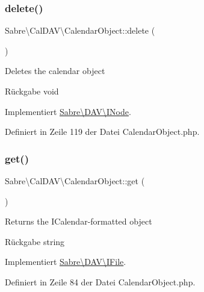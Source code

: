 \subsubsection{\texorpdfstring{delete()}{delete()}}
{\footnotesize\ttfamily Sabre\textbackslash{}\+Cal\+D\+A\+V\textbackslash{}\+Calendar\+Object\+::delete (\begin{DoxyParamCaption}{ }\end{DoxyParamCaption})}

Deletes the calendar object

\begin{DoxyReturn}{Rückgabe}
void 
\end{DoxyReturn}


Implementiert \mbox{\hyperlink{interface_sabre_1_1_d_a_v_1_1_i_node_a72cd0ee4e36dfced2b0412d14dbd73e6}{Sabre\textbackslash{}\+D\+A\+V\textbackslash{}\+I\+Node}}.



Definiert in Zeile 119 der Datei Calendar\+Object.\+php.

\mbox{\label{class_sabre_1_1_cal_d_a_v_1_1_calendar_object_adef5802dc47306abb1e00a18a63ca7eb}} 
\subsubsection{\texorpdfstring{get()}{get()}}
{\footnotesize\ttfamily Sabre\textbackslash{}\+Cal\+D\+A\+V\textbackslash{}\+Calendar\+Object\+::get (\begin{DoxyParamCaption}{ }\end{DoxyParamCaption})}

Returns the I\+Calendar-\/formatted object

\begin{DoxyReturn}{Rückgabe}
string 
\end{DoxyReturn}


Implementiert \mbox{\hyperlink{interface_sabre_1_1_d_a_v_1_1_i_file_a3102812af0567c3cfd9cd6c20104bd27}{Sabre\textbackslash{}\+D\+A\+V\textbackslash{}\+I\+File}}.



Definiert in Zeile 84 der Datei Calendar\+Object.\+php.

\mbox{\label{class_sabre_1_1_cal_d_a_v_1_1_calendar_object_a74f6cef6011e3c8045d1d57b0115ce60}} 
